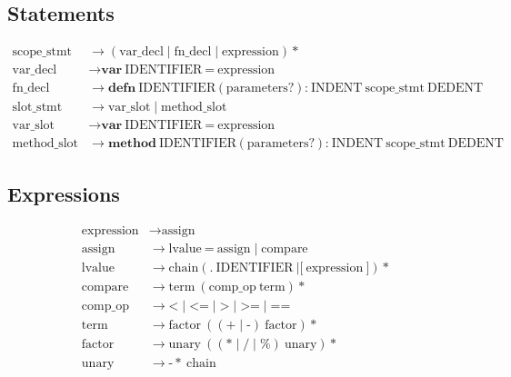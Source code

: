 \documentclass[12pt, a4paper]{article}
\begin{document}
\subsection{Statements}
\[
\begin{aligned}
\text{scope\_stmt} &\rightarrow (\text{var\_decl} \mid \text{fn\_decl} \mid \text{expression})* \\
\text{var\_decl} &\rightarrow \textbf{var}\ \text{IDENTIFIER}\ \textbf{=}\ \text{expression} \\
\text{fn\_decl} &\rightarrow \textbf{defn}\ \text{IDENTIFIER}\ \textbf{(}\ \text{parameters}?\ \textbf{)}\ \textbf{:}\ \text{INDENT}\ \text{scope\_stmt}\ \text{DEDENT} \\
\text{slot\_stmt} &\rightarrow \text{var\_slot} \mid \text{method\_slot} \\
\text{var\_slot} &\rightarrow \textbf{var}\ \text{IDENTIFIER}\ \textbf{=}\ \text{expression} \\
\text{method\_slot} &\rightarrow \textbf{method}\ \text{IDENTIFIER}\ \textbf{(}\ \text{parameters}?\ \textbf{)}\ \textbf{:}\ \text{INDENT}\ \text{scope\_stmt}\ \text{DEDENT}
\end{aligned}
\]

\subsection{Expressions}
\[
\begin{aligned}
\text{expression} &\rightarrow \text{assign} \\
\text{assign} &\rightarrow \text{lvalue}\ \textbf{=}\ \text{assign} \mid \text{compare} \\
\text{lvalue} &\rightarrow \text{chain} (\textbf{.}\ \text{IDENTIFIER}\ | \textbf{[}\ \text{expression}\ \textbf{]})* \\
\text{compare} &\rightarrow \text{term}\ (\text{comp\_op}\ \text{term})* \\
\text{comp\_op} &\rightarrow \textbf{<} \mid \textbf{<=} \mid \textbf{>} \mid \textbf{>=} \mid \textbf{==} \\
\text{term} &\rightarrow \text{factor}\ ((\textbf{+} \mid \textbf{-})\ \text{factor})* \\
\text{factor} &\rightarrow \text{unary}\ ((\textbf{*} \mid \textbf{/} \mid \textbf{\%})\ \text{unary})* \\
\text{unary} &\rightarrow \textbf{-}*\ \text{chain} \\
\end{aligned}
\]
\end{document}
